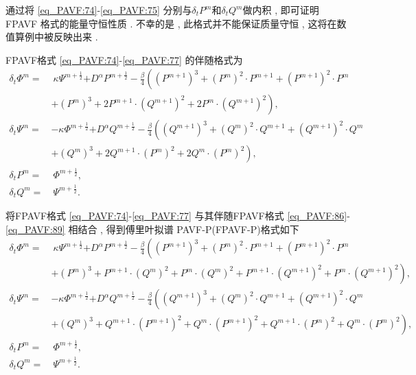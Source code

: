 通过将 \eqref{eq_PAVF:74}-\eqref{eq_PAVF:75} 分别与$\delta_t P^{m}$和$\delta_t Q^{m}$做内积 , 即可证明 FPAVF 格式的能量守恒性质 . 
不幸的是 , 此格式并不能保证质量守恒 , 这将在数值算例中被反映出来 . 

FPAVF格式 \eqref{eq_PAVF:74}-\eqref{eq_PAVF:77} 的伴随格式为
\begin{align}
\delta_{t} \varPhi^{m}=&~\kappa \Psi^{m+\frac{1}{2}}{+D^{\alpha} P^{m+\frac{1}{2}}}-\frac{\beta}{4}\left( (P^{m+1})^3+ (P^{m})^{2}\cdot P^{m+1}+(P^{m+1})^{2}\cdot P^{m}\right . \nonumber\\
	&\left. + (P^{m})^{3}+2 P^{m+1}\cdot (Q^{m+1})^{2}+2 P^{m}\cdot (Q^{m+1})^{2}\right) , \label{eq_PAVF:86}\\
\delta_{t} \Psi^{m}=&-\kappa \varPhi^{m+\frac{1}{2}}{+D^{\alpha} Q^{m+\frac{1}{2}}}-\frac{\beta}{4}\left( (Q^{m+1})^3+ (Q^{m})^{2}\cdot Q^{m+1}+ (Q^{m+1})^{2}\cdot Q^{m}\right . \nonumber\\
	&\left . + (Q^{m})^{3}+2 Q^{m+1}\cdot (P^{m})^{2}+2 Q^{m}\cdot (P^{m})^{2}\right) , \label{eq_PAVF:87}\\
\delta_{t} P^{m}=&~\varPhi^{m+\frac{1}{2}} , \label{eq_PAVF:88}\\
\delta_{t} Q^{m}=&~\Psi^{m+\frac{1}{2}} . \label{eq_PAVF:89}
\end{align}

将FPAVF格式 \eqref{eq_PAVF:74}-\eqref{eq_PAVF:77} 与其伴随FPAVF格式 \eqref{eq_PAVF:86}-\eqref{eq_PAVF:89} 相结合 , 得到傅里叶拟谱 PAVF-P(FPAVF-P)格式如下
\begin{align}
\delta_{t} \varPhi^{m}=&~\kappa \Psi^{m+\frac{1}{2}}{+D^{\alpha} P^{m+\frac{1}{2}}}-\frac{\beta}{4}\left((P^{m+1})^3+(P^{m})^{2}\cdot P^{m+1}+(P^{m+1})^{2}\cdot P^{m}\right . \nonumber\\
	&\left . +(P^{m})^{3}+P^{m+1}\cdot (Q^{m})^{2}+P^{m}\cdot (Q^{m})^{2}+P^{m+1}\cdot (Q^{m+1})^{2}+P^{m}\cdot (Q^{m+1})^{2}\right) , \label{eq_PAVF:98}\\
\delta_{t} \Psi^{m}=&-\kappa \varPhi^{m+\frac{1}{2}}{+D^{\alpha} Q^{m+\frac{1}{2}}}-\frac{\beta}{4}\left((Q^{m+1})^3+(Q^{m})^{2}\cdot Q^{m+1}+(Q^{m+1})^{2}\cdot Q^{m}\right . \nonumber\\
	&\left . +(Q^{m})^{3}+Q^{m+1}\cdot (P^{m+1})^{2}+Q^{m}\cdot (P^{m+1})^{2}+Q^{m+1}\cdot (P^{m})^{2}+Q^{m}\cdot (P^{m})^{2}\right) , \label{eq_PAVF:99}\\
\delta_{t} P^{m}=&~\varPhi^{m+\frac{1}{2}} , \label{eq_PAVF:100}\\
\delta_{t} Q^{m}=&~\Psi^{m+\frac{1}{2}} . \label{eq_PAVF:101}
\end{align}

